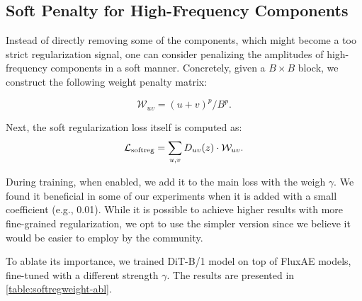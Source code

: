 


\subsection{Soft Penalty for High-Frequency Components}

Instead of directly removing some of the components, which might become a too strict regularization signal, one can consider penalizing the amplitudes of high-frequency components in a soft manner.
Concretely, given a $B \times B$ block, we construct the following weight penalty matrix:

\begin{equation}\label{eq:soft-hf-penalty-matrix}
\mathcal{W}_{uv} = (u + v)^p / B^p.
\end{equation}

Next, the soft regularization loss itself is computed as:
\begin{equation}\label{eq:soft-hf-penalty}
\mathcal{L}_\text{softreg} = \sum_{u,v} D_{uv}(z) \cdot \mathcal{W}_{uv}.
\end{equation}

During training, when enabled, we add it to the main loss with the weigh $\gamma$.
We found it beneficial in some of our experiments when it is added with a small coefficient (e.g., 0.01).
While it is possible to achieve higher results with more fine-grained regularization, we opt to use the simpler version since we believe it would be easier to employ by the community.

To ablate its importance, we trained DiT-B/1 model on top of FluxAE models, fine-tuned with a different strength $\gamma$.
The results are presented in \cref{table:softregweight-abl}.

